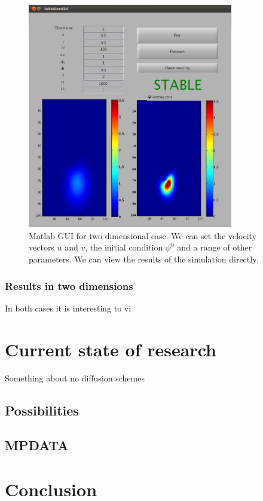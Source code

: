\documentclass[10pt, a4paper]{article}
\begin{document}
\begin{figure}
\centering
 \includegraphics[width=0.8\textwidth]{2dscreenshot.jpg}
 \caption{Matlab GUI for two dimensional case. We can set the velocity vectors $u$ and $v$, the initial condition $\psi^0$ and a range of other parameters. We can view the results of the simulation directly.}
 \label{fig:2dgui}
\end{figure}

\subsubsection{Results in two dimensions}

In both cases it is interesting to vi
\section{Current state of research}
Something about no diffusion schemes
\subsection{Possibilities}
\subsection{MPDATA}
\section{Conclusion}
\end{document}

